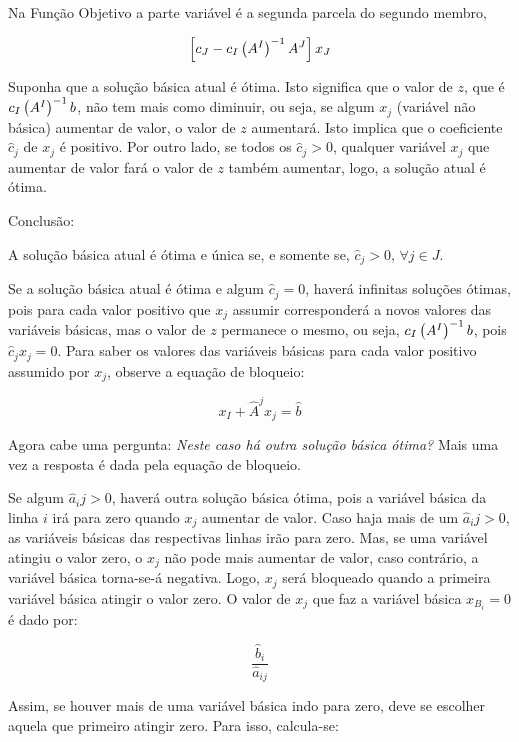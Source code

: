Na Função Objetivo a parte variável é a segunda parcela do segundo membro,

\[
  \left[ c_J - c_I \left(A^{I}\right)^{-1} A^{J} \right]  x_J
\]

Suponha que a solução básica atual é ótima.
Isto significa que o valor de $ z $, que é $ c_I \left(A^{I}\right)^{-1} b $, não tem mais 
como diminuir, ou seja, se algum $ x_j $ (variável não básica) aumentar de valor,
o valor de $ z $ aumentará.
Isto implica que o coeficiente $ \widehat{c}_j $ de $ x_j $ é positivo.
Por outro lado, se todos os $ \widehat{c}_j > 0 $, qualquer variável $ x_j $
que aumentar de valor fará o valor de $ z $ também aumentar, logo, a solução 
atual é ótima.

Conclusão:

\begin{center}
\fbox
{
  \begin{minipage}{0.7\linewidth}
    A solução básica atual é ótima e única se, e somente se, $ \widehat{c}_j > 0 $,
    $ \forall j \in J $.
  \end{minipage}
}
\end{center}

Se a solução básica atual é ótima e algum $ \widehat{c}_j = 0 $, haverá infinitas 
soluções ótimas, pois para cada valor positivo que $ x_j $ assumir corresponderá 
a novos valores das variáveis básicas, mas o valor de $ z $ permanece o mesmo, 
ou seja, $ c_I \left(A^{I}\right)^{-1} b $, pois $ \widehat{c}_j x_j = 0 $.
Para saber os valores das variáveis básicas para cada valor positivo assumido
por $ x_j $, observe a equação de bloqueio:

\[
  x_I + \widehat{A}^j x_j = \widehat{b}
\]

Agora cabe uma pergunta: \textit{Neste caso há outra solução básica ótima?}
Mais uma vez a resposta é dada pela equação de bloqueio.

Se algum $ \widehat{a}_ij > 0 $, haverá outra solução básica ótima, pois a 
variável básica da linha $ i $ irá para zero quando $ x_j $ aumentar de valor.
Caso haja mais de um $ \widehat{a}_ij > 0 $, as variáveis básicas das respectivas
linhas irão para zero.
Mas, se uma variável atingiu o valor zero, o $ x_j $ não pode mais aumentar de 
valor, caso contrário, a variável básica torna-se-á negativa.
Logo, $ x_j $ será bloqueado quando a primeira variável básica atingir o valor
zero.
O valor de $ x_j $ que faz a variável básica $ x_{B_i} = 0 $ é dado por:

\[
  \frac{\widehat{b}_i}{\widehat{a}_{ij}}  
\]

Assim, se houver mais de uma variável básica indo para zero, deve se escolher
aquela que primeiro atingir zero.
Para isso, calcula-se:

